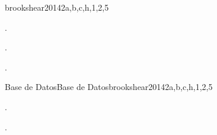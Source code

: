 \begin{syllabus}
\begin{unit}{\ALFundamentalDataStructuresandAlgorithms}{}{brookshear2014}{2}{a,b,c,h,1,2,5}
   \begin{topics}
    \item \SDFFundamentalDataStructuresTopicAbstract
    \item \SDFFundamentalDataStructuresTopicLinked
    \item \ALFundamentalDataStructuresandAlgorithmsTopicSimple
    \item \ALFundamentalDataStructuresandAlgorithmsTopicSequential
    \item \ALFundamentalDataStructuresandAlgorithmsTopicBinary
    \item \ALAdvancedDataStructuresAlgorithmsandAnalysisTopicBalanced
    \item \ALAdvancedDataStructuresAlgorithmsandAnalysisTopicAdvanced
   \end{topics}
   \begin{learningoutcomes}
     \item \ALFundamentalDataStructuresandAlgorithmsLOImplement [\Familiarity].
     \item \ALFundamentalDataStructuresandAlgorithmsLOImplementSimple [\Familiarity].
     \item \ALFundamentalDataStructuresandAlgorithmsLODiscussFactors [\Familiarity].
   \end{learningoutcomes}
\end{unit}

\begin{unit}{Base de Datos}{Base de Datos}{brookshear2014}{2}{a,b,c,h,1,2,5}
   \begin{topics}
      \item \IMDatabaseSystemsTopicApproaches
      \item \IMDatabaseSystemsTopicComponents
      \item \IMDatabaseSystemsTopicDesign
      \item \IMDatabaseSystemsTopicDatabase
      \item \IMDatabaseSystemsTopicUse
   \end{topics}
   \begin{learningoutcomes}
      \item \IMDatabaseSystemsLOExplainTheDistinguish [\Familiarity].
      \item \IMDatabaseSystemsLODescribeTheDesigns [\Familiarity].
   \end{learningoutcomes}
\end{unit}


\end{syllabus}
